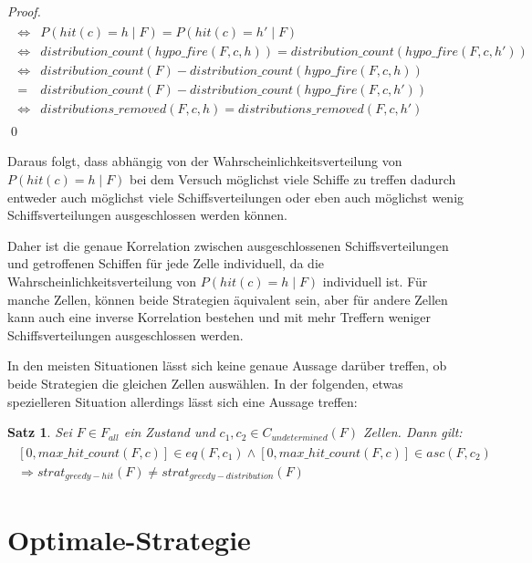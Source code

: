 \documentclass[a4paper,12pt]{llncs}
\numberwithin{equation}{section}
\newtheorem{satz}{Satz}
\begin{document}
\begin{proof}
\begin{align}
\begin{split}
\Leftrightarrow &P(hit(c)=h \mid F) = P(hit(c)=h' \mid F) \\
\Leftrightarrow &distribution\_count(hypo\_fire(F,c, h)) = distribution\_count(hypo\_fire(F,c, h')) \\
\Leftrightarrow &distribution\_count(F) - distribution\_count(hypo\_fire(F,c, h)) \\
= &distribution\_count(F) - distribution\_count(hypo\_fire(F,c, h')) \\
\Leftrightarrow &distributions\_removed(F,c, h) = distributions\_removed(F,c, h')
\nonumber
\end{split}
\end{align}
\qed
\end{proof}

Daraus folgt, dass abhängig von der Wahrscheinlichkeitsverteilung von $P(hit(c)=h \mid F)$ bei dem Versuch möglichst viele Schiffe zu treffen dadurch entweder auch möglichst viele Schiffsverteilungen oder eben auch möglichst wenig Schiffsverteilungen ausgeschlossen werden können.

Daher ist die genaue Korrelation zwischen ausgeschlossenen Schiffsverteilungen und getroffenen Schiffen für jede Zelle individuell, da die Wahrscheinlichkeitsverteilung von $P(hit(c)=h \mid F)$ individuell ist. Für manche Zellen, können beide Strategien äquivalent sein, aber für andere Zellen kann auch eine inverse Korrelation bestehen und mit mehr Treffern weniger Schiffsverteilungen ausgeschlossen werden.

In den meisten Situationen lässt sich keine genaue Aussage darüber treffen, ob beide Strategien die gleichen Zellen auswählen. In der folgenden, etwas spezielleren Situation allerdings lässt sich eine Aussage treffen:

\begin{satz}
Sei $F\in F_{all}$ ein Zustand und $c_1, c_2 \in C_{undetermined}(F)$ Zellen.
Dann gilt:
\begin{align}
\begin{split}
[0,max\_hit\_count(F, c)] \in eq(F, c_1) \wedge [0,max\_hit\_count(F, c)] \in asc(F, c_2)\\
\Rightarrow strat_{greedy-hit}(F) \neq strat_{greedy-distribution}(F)
\end{split}
\end{align}


\end{satz}


\section{Optimale-Strategie}
\end{document}
